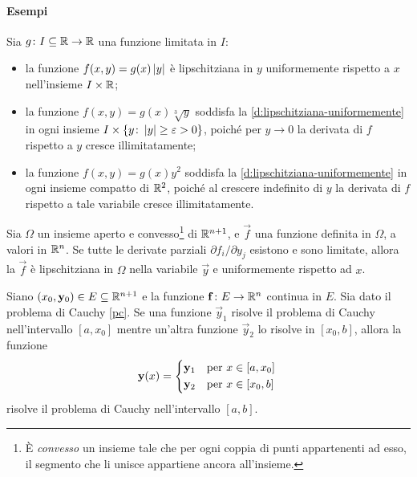 \paragraph{Esempi}
Sia $g\colon I\subseteq\mathbb{R}\to\mathbb{R}$ una funzione limitata in $I$:
\begin{itemize}
	\item la funzione $f(x,y)=g(x)\left|{y}\right|$ è lipschitziana in $y$ uniformemente rispetto a $x$ nell'insieme $I\times\mathbb{R}$;
	\item la funzione $f(x,y)=g(x)\sqrt[3]{y}$ soddisfa la \ref{d:lipschitziana-uniformemente} in ogni insieme $I\times\{y\colon\left|{y}\right|\geq\varepsilon>0\}$, poiché per $y\to 0$ la derivata di $f$ rispetto a $y$ cresce illimitatamente;
	\item la funzione $f(x,y)=g(x)y^2$ soddisfa la \ref{d:lipschitziana-uniformemente} in ogni insieme compatto di $\mathbb{R}^2$, poiché al crescere indefinito di $y$ la derivata di $f$ rispetto a tale variabile cresce illimitatamente.
\end{itemize}
\begin{osservazione}
	Sia $\Omega$ un insieme aperto e convesso\footnote{È \emph{convesso} un insieme tale che per ogni coppia di punti appartenenti ad esso, il segmento che li unisce appartiene ancora all'insieme.} di $\mathbb{R}^{n+1}$, e $\vec f$ una funzione definita in $\Omega$, a valori in $\mathbb{R}^n$.
	Se tutte le derivate parziali $\partial f_i/\partial y_j$ esistono e sono limitate, allora la $\vec f$ è lipschitziana in $\Omega$ nella variabile $\vec y$ e uniformemente rispetto ad $x$.
\end{osservazione}
\begin{lemma}[di saldatura] \label{l:saldatura}
	Siano $(x_0,\mathbf{y}_0)\in E\subseteq\mathbb{R}^{n+1}$ e la funzione $\mathbf{f}\colon E\to\mathbb{R}^n$ continua in $E$.
	Sia dato il problema di Cauchy \eqref{pc}.
	Se una funzione $\vec y_1$ risolve il problema di Cauchy nell'intervallo $[a,x_0]$ mentre un'altra funzione $\vec y_2$ lo risolve in $[x_0,b]$, allora la funzione
	\begin{equation*}
		\vec y(x)=
		\begin{cases*}
			\vec y_1&per $x\in[a,x_0]$\\
			\vec y_2&per $x\in[x_0,b]$
		\end{cases*}
	\end{equation*}
	risolve il problema di Cauchy nell'intervallo $[a,b]$.
\end{lemma}
